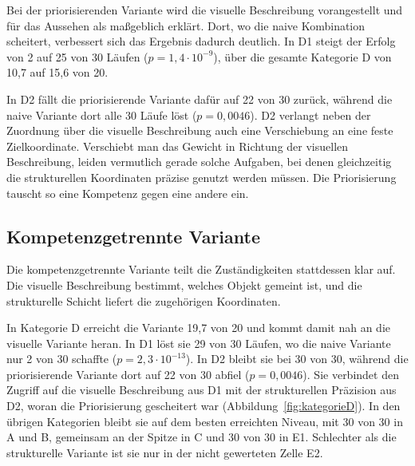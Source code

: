 Bei der priorisierenden Variante wird die visuelle Beschreibung vorangestellt und für das Aussehen als maßgeblich erklärt.
Dort, wo die naive Kombination scheitert, verbessert sich das Ergebnis dadurch deutlich.
In D1 steigt der Erfolg von 2 auf 25 von 30 Läufen ($p = 1{,}4\cdot10^{-9}$), über die gesamte Kategorie D von 10,7 auf 15,6 von 20.

In D2 fällt die priorisierende Variante dafür auf 22 von 30 zurück, während die naive Variante dort alle 30 Läufe löst ($p = 0{,}0046$).
D2 verlangt neben der Zuordnung über die visuelle Beschreibung auch eine Verschiebung an eine feste Zielkoordinate.
Verschiebt man das Gewicht in Richtung der visuellen Beschreibung, leiden vermutlich gerade solche Aufgaben, bei denen gleichzeitig die strukturellen Koordinaten präzise genutzt werden müssen.
Die Priorisierung tauscht so eine Kompetenz gegen eine andere ein.

\subsection*{Kompetenzgetrennte Variante}

Die kompetenzgetrennte Variante teilt die Zuständigkeiten stattdessen klar auf.
Die visuelle Beschreibung bestimmt, welches Objekt gemeint ist, und die strukturelle Schicht liefert die zugehörigen Koordinaten.

In Kategorie D erreicht die Variante 19,7 von 20 und kommt damit nah an die visuelle Variante heran.
In D1 löst sie 29 von 30 Läufen, wo die naive Variante nur 2 von 30 schaffte ($p = 2{,}3\cdot10^{-13}$).
In D2 bleibt sie bei 30 von 30, während die priorisierende Variante dort auf 22 von 30 abfiel ($p = 0{,}0046$).
Sie verbindet den Zugriff auf die visuelle Beschreibung aus D1 mit der strukturellen Präzision aus D2, woran die Priorisierung gescheitert war (Abbildung~\ref{fig:kategorieD}).
In den übrigen Kategorien bleibt sie auf dem besten erreichten Niveau, mit 30 von 30 in A und B, gemeinsam an der Spitze in C und 30 von 30 in E1.
Schlechter als die strukturelle Variante ist sie nur in der nicht gewerteten Zelle E2.


